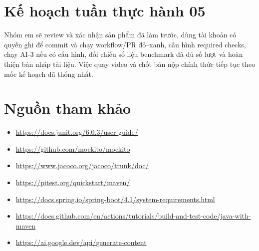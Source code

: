 \documentclass[12pt,a4paper]{article}
\begin{document}
\section{Kế hoạch tuần thực hành 05}
Nhóm em sẽ review và xác nhận sản phẩm đã làm trước, dùng tài khoản có quyền ghi để commit và chạy workflow/PR đỏ--xanh, cấu hình required checks, chạy AI-3 nếu có cấu hình, đối chiếu số liệu benchmark đã đủ số lượt và hoàn thiện bản nháp tài liệu. Việc quay video và chốt bản nộp chính thức tiếp tục theo mốc kế hoạch đã thống nhất.

\section{Nguồn tham khảo}
\begin{itemize}
\item \url{https://docs.junit.org/6.0.3/user-guide/}
\item \url{https://github.com/mockito/mockito}
\item \url{https://www.jacoco.org/jacoco/trunk/doc/}
\item \url{https://pitest.org/quickstart/maven/}
\item \url{https://docs.spring.io/spring-boot/4.1/system-requirements.html}
\item \url{https://docs.github.com/en/actions/tutorials/build-and-test-code/java-with-maven}
\item \url{https://ai.google.dev/api/generate-content}
\end{itemize}
\end{document}
